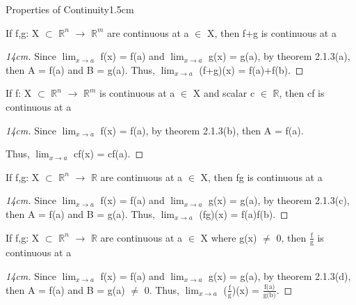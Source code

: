     \begin{ltheorem}{Properties of Continuity}{1.5cm}
        \item If f,g: X $\subset$ $\mathbb{R}^n$ $\rightarrow$ $\mathbb{R}^m$
            are continuous at a $\in$ X, then f+g is continuous at a

            \begin{proof}[14cm]
                Since $\lim_{x \rightarrow a}$ f(x) = f(a)
                and $\lim_{x \rightarrow a}$ g(x) = g(a),
                by {\color{red} theorem 2.1.3(a)}, then A = f(a) and B = g(a).
                Thus, $\lim_{x \rightarrow a}$ (f+g)(x) = f(a)+f(b).
            \end{proof}

        \item If f: X $\subset$ $\mathbb{R}^n$ $\rightarrow$ $\mathbb{R}^m$
            is continuous at a $\in$ X and scalar c $\in$ $\mathbb{R}$,
            then cf is continuous at a

            \begin{proof}[14cm]
                Since $\lim_{x \rightarrow a}$ f(x) = f(a),
                by {\color{red} theorem 2.1.3(b)}, then A = f(a).

                Thus, $\lim_{x \rightarrow a}$ cf(x) = cf(a).
            \end{proof}

        \item If f,g: X $\subset$ $\mathbb{R}^n$ $\rightarrow$ $\mathbb{R}$
            are continuous at a $\in$ X, then fg is continuous at a

            \begin{proof}[14cm]
                Since $\lim_{x \rightarrow a}$ f(x) = f(a)
                and $\lim_{x \rightarrow a}$ g(x) = g(a),
                by {\color{red} theorem 2.1.3(c)}, then A = f(a) and B = g(a).
                Thus, $\lim_{x \rightarrow a}$ (fg)(x) = f(a)f(b).
            \end{proof}

        \item If f,g: X $\subset$ $\mathbb{R}^n$ $\rightarrow$ $\mathbb{R}$
            are continuous at a $\in$ X where g(x) $\not =$ 0, then
            $\frac{\text{f}}{\text{g}}$ is continuous at a

            \begin{proof}[14cm]
                Since $\lim_{x \rightarrow a}$ f(x) = f(a)
                and $\lim_{x \rightarrow a}$ g(x) = g(a),
                by {\color{red} theorem 2.1.3(d)}, then A = f(a)
                and B = g(a) $\not =$ 0.
                Thus, $\lim_{x \rightarrow a}$ ($\frac{\text{f}}{\text{g}}$)(x)
                = $\frac{\text{f(a)}}{\text{g(b)}}$.
            \end{proof}
    \end{ltheorem}

